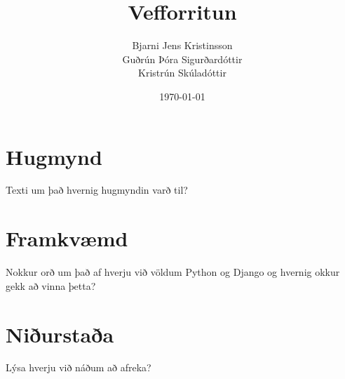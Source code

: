 \documentclass[a4paper,oneside]{article}
\title{Vefforritun}
\date{\today}
\author{Bjarni Jens Kristinsson \\ Guðrún Þóra Sigurðardóttir \\ Kristrún Skúladóttir}
\begin{document}
\maketitle

\section{Hugmynd}
Texti um það hvernig hugmyndin varð til?

\section{Framkvæmd}
Nokkur orð um það af hverju við völdum Python og Django og hvernig okkur
gekk að vinna þetta?

\section{Niðurstaða}
Lýsa hverju við náðum að afreka?
\end{document}
